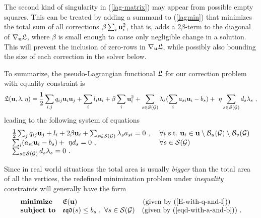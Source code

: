 \documentclass[final]{siamltex}
\begin{document}
\par The second kind of singularity in (\ref{lag-matrix}) may appear from possible empty squares. This
can be treated by adding a summand to (\ref{lagmin}) that
minimizes the total sum of all corrections $\beta \sum_i
{\bf u}_{i}^2$, that is,  adds a $2\beta$-term to the diagonal of
$\nabla_{{\bf u}}\mathfrak{L}$, where $\beta$ is small enough to cause only
negligible change in a solution. This will prevent the inclusion
of zero-rows in $\nabla_{{\bf u}}\mathfrak{L}$, while possibly also bounding the
size of each correction in the solver below.
\par To summarize, the pseudo-Lagrangian functional $\mathfrak{L}$ for our correction problem with equality
constraint is
\begin{equation}\label{pseudo-Lag}
\mathfrak{L}({\bf u}, \lambda, \eta)= \frac{1}{2}\sum_{i,j}q_{ij}{\bf u}_i {\bf u}_j +
\sum_{i}l_i{\bf u}_i  + \beta \sum_{i} {\bf u}_{i}^2 + \sum_{s\in \mathcal{S}(\mathcal{G})}
\lambda_s(\sum_{i}a_{si}{\bf u}_i-b_s) +~ \eta \sum_{s\in \mathcal{S}(\mathcal{G})} d_s
\lambda_s~,
\end{equation}
leading to the following system of equations
\begin{equation}\label{full-ineq-problem-in-q-l-a-b}
\begin{array}{ll}
\frac{1}{2}\sum_{j}q_{ij}{\bf u}_j + l_i  + 2\beta {\bf u}_{i} +
\sum_{s\in \mathcal{S}(\mathcal{G})} \lambda_s a_{si} =0  ~,~ & \forall i
~\text{s.t.}~ {\bf u}_{i} \in {\bf u}
\setminus \mathcal{B}_u(\mathcal{G}) \setminus \mathcal{B}_v(\mathcal{G}) \\
\sum_{i}(a_{si}{\bf u}_i-b_s) +~ \eta d_s =0 ~,~ &
\forall s \in \mathcal{S}(\mathcal{G}) ~ \\
\sum_{s\in \mathcal{S}(\mathcal{G})} d_s \lambda_s =0 ~.&
\end{array}
\end{equation}
\par Since in real world situations the total area is usually {\it bigger}
than the total area of all the vertices, the redefined
minimization problem
under {\it inequality} constraints will generally have the form
\begin{equation}\label{full-ineq-problem}
\begin{array}{ll}
\mbox{\textbf{minimize}}  & \mathfrak{E}({\bf u}) ~~~~~~~~~~~~~~~~~~~~~~~~~~~~(\text{given by }  (\ref{E-with-q-and-l}))\\
\mbox{\textbf{subject to}}   & \mathfrak{eqd}(s)\leq b_s ~,~
\forall s \in \mathcal{S}(\mathcal{G}) ~~~(\text{given by } (\ref{eqd-with-a-and-b}))~.
\end{array}
\end{equation}
\end{document}
